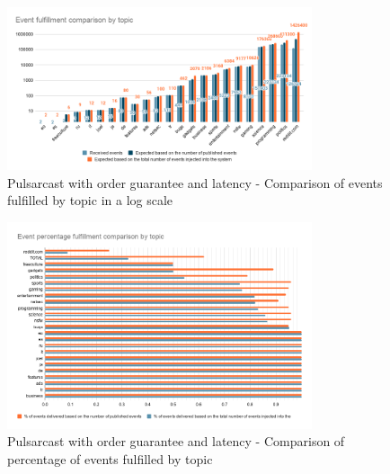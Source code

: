 \begin{figure}[!htb]
  \centering
  \includegraphics[width=0.8\textwidth]{../images/graph-pulsarcast-order-latency-event-fulfillment-comparison.png}
  \caption{Pulsarcast with order guarantee and latency - Comparison of events fulfilled by topic in a log scale}
  \label{fig:graph-pulsarcast-order-latency-event-fulfillment-comparison}
\end{figure}

\begin{figure}[!htb]
  \centering
  \includegraphics[width=0.8\textwidth]{../images/graph-pulsarcast-order-latency-event-percentage-fulfillment-comparison.png}
  \caption{Pulsarcast with order guarantee and latency - Comparison of percentage of events fulfilled by topic}
  \label{fig:graph-pulsarcast-order-latency-event-percentage-fulfillment-comparison}
\end{figure}

